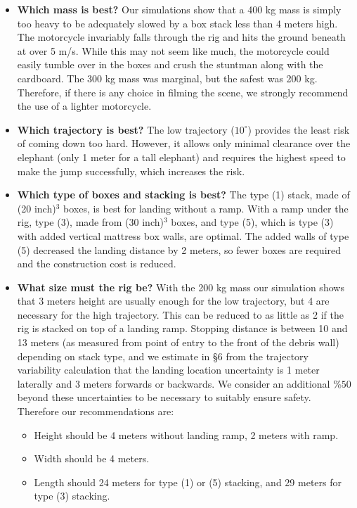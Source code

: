 \documentclass[12pt,a4paper,titlepage]{article}
\begin{document}
\begin{itemize}

\item {\bf Which mass is best?}  Our simulations show that a 400 kg mass is simply too heavy to be
adequately slowed by a box stack less than 4 meters high.  The motorcycle invariably falls
through the rig and hits the ground beneath at over 5 m/s.  While this may not seem like much,
the motorcycle could easily tumble over in the boxes and crush the stuntman along with the cardboard.
The 300 kg mass was marginal, but the safest was 200 kg. Therefore, if there is any choice in
filming the scene, we strongly recommend the use of a lighter motorcycle.

\item {\bf Which trajectory is best?}  The low trajectory ($10^\circ$) provides the least risk of coming
down too hard.  However, it allows only minimal clearance over the elephant (only 1 meter for a tall elephant)
and requires the highest speed to make the jump successfully, which increases the risk.

\item {\bf Which type of boxes and stacking is best?}  The type (1) stack, made of (20 inch)$^3$
boxes, is best for landing without a ramp.  With a ramp under the
rig, type (3), made from (30 inch)$^3$ boxes, and type (5), which
is type (3) with added vertical mattress box walls, are optimal.
The added walls of type (5) decreased the landing distance by 2
meters, so fewer boxes are required and the construction cost is
reduced.

\item {\bf What size must the rig be?}  With the 200 kg mass our simulation shows that 3 meters height are usually
enough for the low trajectory, but 4 are necessary for the high trajectory.  This can be reduced to as
little as 2 if the rig is stacked on top of a landing ramp.  Stopping distance is between 10 and 13 meters
(as measured from point of entry to the front of the debris wall) depending
on stack type, and we estimate in \S6 from the trajectory variability calculation that the landing location
uncertainty is 1 meter laterally and 3 meters forwards or backwards.  We consider an additional $\%50$ beyond these uncertainties
to be necessary to suitably ensure safety.  Therefore our recommendations are:
\begin{itemize}
\item Height should be 4 meters without landing ramp, 2 meters with ramp.
\item Width should be 4 meters.
\item Length should 24 meters for type (1) or (5) stacking, and 29 meters for type (3) stacking.
\end{itemize}


\end{itemize}
\end{document}
